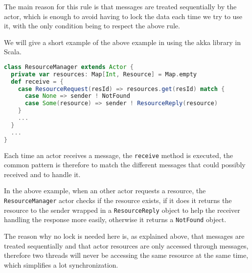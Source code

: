 The main reason for this rule is that messages are treated sequentially by the 
actor, which is enough to avoid having to lock the data each time we try to use it, 
with the only condition being to respect the above rule.

We will give a short example of the above example in using the akka library in Scala.
%
\begin{lstlisting}[basicstyle=\footnotesize,caption=Threading using actors,label=list:actor-example,language=scala]
class ResourceManager extends Actor {
  private var resources: Map[Int, Resource] = Map.empty
  def receive = {
    case ResourceRequest(resId) => resources.get(resId) match { 
      case None => sender ! NotFound
      case Some(resource) => sender ! ResourceReply(resource)
    }
    ...
  }
  ...
}
\end{lstlisting}
Each time an actor receives a message, the \lstinline{receive} method is executed, 
the common pattern is therefore to match the different messages that could possibly 
received and to handle it.

In the above example, when an other actor requests a resource, the \lstinline{ResourceManager} 
actor checks if the resource exists, if it does it returns the resource to the sender 
wrapped in a \lstinline{ResourceReply} object to help the receiver handling the 
response more easily, otherwise it returns a \lstinline{NotFound} object.

The reason why no lock is needed here is, as explained above, that messages are treated 
sequentially and that actor resources are only accessed through messages, therefore 
two threads will never be accessing the same resource at the same time, which 
simplifies a lot synchronization.
